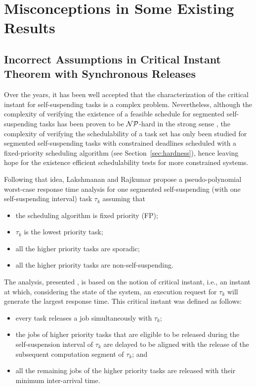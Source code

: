 
\section{Misconceptions in Some Existing Results}
\subsection{Incorrect Assumptions in Critical Instant Theorem with Synchronous Releases}
\label{sec:wrong-critical}

Over the years, it has been well accepted that the characterization of the critical instant for self-suspending tasks is a complex problem. Nevertheless, although the complexity of verifying the existence of a feasible schedule for segmented self-suspending tasks has been proven to be ${\cal NP}$-hard in the strong sense \cite{Ridouard_2004}, the complexity of verifying the schedulability of a task set has only been studied for segmented self-suspending tasks with constrained deadlines scheduled with a fixed-priority scheduling algorithm (see Section~\ref{sec:hardness}), hence leaving hope for the existence efficient schedulability tests for more constrained systems. 

Following that idea, Lakshmanan and Rajkumar \cite{LR:rtas10} propose a pseudo-polynomial worst-case response time analysis for one segmented self-suspending (with one self-suspending interval) task $\tau_k$ assuming that 
\begin{itemize}
\item the scheduling algorithm is fixed priority (FP);
\item $\tau_k$ is the lowest priority task; 
\item all the higher priority tasks are sporadic;
\item all the higher priority tasks are non-self-suspending.
\end{itemize}
The analysis, presented \cite{LR:rtas10}, is based on the notion of critical instant, i.e., an instant at which, considering the state of the system, an execution request for $\tau_k$ will generate the largest response time. This critical instant was defined as follows:
\begin{itemize}
	\item every task releases a job simultaneously with $\tau_k$;
	\item the jobs of higher priority tasks that are eligible to be released during the self-suspension interval of $\tau_k$ are delayed to be aligned with the release of the subsequent computation segment of $\tau_k$; and
	\item all the remaining jobs of the higher priority tasks are released with their minimum inter-arrival time.
\end{itemize}

